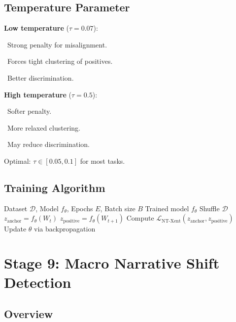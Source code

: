 \documentclass[12pt]{article}
\begin{document}
\subsection{Temperature Parameter}

\begin{tcolorbox}[colback=blue!5!white, colframe=blue!75!black, title=Role of Temperature $\tau$]
\textbf{Low temperature} ($\tau = 0.07$):

\textbullet\ Strong penalty for misalignment.

\textbullet\ Forces tight clustering of positives.

\textbullet\ Better discrimination.

\textbf{High temperature} ($\tau = 0.5$):

\textbullet\ Softer penalty.

\textbullet\ More relaxed clustering.

\textbullet\ May reduce discrimination.

Optimal: $\tau \in [0.05, 0.1]$ for most tasks.
\end{tcolorbox}

\subsection{Training Algorithm}

\begin{algorithm}[H]
\caption{Contrastive Training Loop}
\begin{algorithmic}[1]
\REQUIRE Dataset $\mathcal{D}$, Model $f_\theta$, Epochs $E$, Batch size $B$
\ENSURE Trained model $f_\theta$
    \STATE Shuffle $\mathcal{D}$
        \STATE $z_{\text{anchor}} = f_\theta(W_t)$
        \STATE $z_{\text{positive}} = f_\theta(W_{t+1})$
        \STATE Compute $\mathcal{L}_{\text{NT-Xent}}(z_{\text{anchor}}, z_{\text{positive}})$
        \STATE Update $\theta$ via backpropagation
    \ENDFOR
\ENDFOR
\end{algorithmic}
\end{algorithm}

\newpage

\section{Stage 9: Macro Narrative Shift Detection}

\subsection{Overview}
\end{document}
